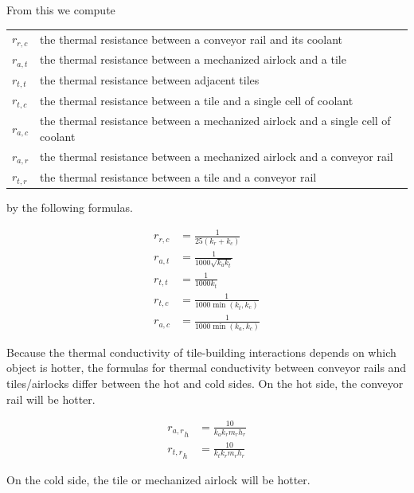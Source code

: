 \documentclass{article}
\numberwithin{equation}{subsection}
\theoremstyle{remark}
\newenvironment{definitiontable}{
\renewcommand{\arraystretch}{1.5}
\begin{tabular}{lp{0.8\textwidth}}
}
{
\end{tabular}
\renewcommand{\arraystretch}{1.0}
}
\begin{document}
From this we compute

\begin{definitiontable}
\(r_{r,c}\) & the thermal resistance between a conveyor rail and its coolant \\

\(r_{a,t}\) & the thermal resistance between a mechanized airlock and a tile \\

\(r_{t,t}\) & the thermal resistance between adjacent tiles \\

\(r_{t,c}\) & the thermal resistance between a tile and a single cell of coolant \\

\(r_{a,c}\) & the thermal resistance between a mechanized airlock and a single cell of coolant \\

\(r_{a,r}\) & the thermal resistance between a mechanized airlock and a conveyor rail \\

\(r_{t,r}\) & the thermal resistance between a tile and a conveyor rail
\end{definitiontable}

by the following formulas.

\begin{align}
r_{r,c} &= \frac{1}{25 \left(k_{r} + k_{c}\right)} \\
r_{a,t} &= \frac{1}{1000 \sqrt{k_{a} k_{t}}} \\
r_{t,t} &= \frac{1}{1000 k_{t}} \\
r_{t,c} &= \frac{1}{1000 \min \left(k_{t}, k_{c}\right)} \\
r_{a,c} &= \frac{1}{1000 \min \left(k_{a}, k_{c}\right)}
\end{align}

Because the thermal conductivity of tile-building interactions depends on which object is hotter, the formulas for thermal conductivity between conveyor rails and tiles/airlocks differ between the hot and cold sides.
On the hot side, the conveyor rail will be hotter.

\begin{align}
{r_{a,r}}_{h} &= \frac{10}{k_{a} k_{r} m_{r} h_{r}} \\
{r_{t,r}}_{h} &= \frac{10}{k_{t} k_{r} m_{r} h_{r}}
\end{align}

On the cold side, the tile or mechanized airlock will be hotter.
\end{document}
